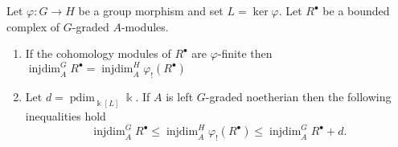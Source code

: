 \documentclass[11pt,fleqn]{article}
\renewcommand\to{\longrightarrow}
\renewcommand\phi{\varphi}
\renewcommand\k{\Bbbk}
\DeclareMathOperator\injdim{injdim}
\DeclareMathOperator\projdim{pdim}
\begin{document}
\begin{Lemma*}
Let $\phi: G \to H$ be a group morphism and set $L = \ker \phi$. Let 
$R^\bullet$ be a bounded complex of $G$-graded $A$-modules. 
\begin{enumerate}
\item 
\label{phi-finite-derived-injdim}
If the cohomology modules of $R^\bullet$ are $\phi$-finite then
$\injdim_A^{G} R^\bullet = \injdim_A^H \phi_!(R^\bullet)$

\item 
\label{noetherian-derived-injdim}
Let $d = \projdim_{\k[L]} \k$. If $A$ is left $G$-graded noetherian then 
the following inequalities hold
\[
 \injdim_A^G R^\bullet 
  \leq \injdim_A^H \phi_!(R^\bullet) 
  \leq \injdim_A^G R^\bullet + d.
\]
\end{enumerate}
\end{Lemma*}
\end{document}
